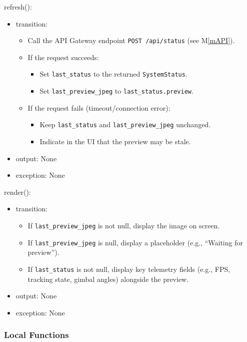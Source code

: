 \documentclass[12pt, titlepage]{article}
\newcommand{\mref}[1]{M\ref{#1}}
\begin{document}
\noindent refresh():
\begin{itemize}
  \item transition:
        \begin{itemize}
          \item Call the API Gateway endpoint \texttt{POST /api/status} (see \mref{mAPI}).
          \item If the request succeeds:
                \begin{itemize}
                  \item Set \texttt{last\_status} to the returned \texttt{SystemStatus}.
                  \item Set \texttt{last\_preview\_jpeg} to \texttt{last\_status.preview}.
                \end{itemize}
          \item If the request fails (timeout/connection error):
                \begin{itemize}
                  \item Keep \texttt{last\_status} and \texttt{last\_preview\_jpeg} unchanged.
                  \item Indicate in the UI that the preview may be stale.
                \end{itemize}
        \end{itemize}
  \item output: None
  \item exception: None
\end{itemize}

\noindent render():
\begin{itemize}
  \item transition:
        \begin{itemize}
          \item If \texttt{last\_preview\_jpeg} is not null, display the image on screen.
          \item If \texttt{last\_preview\_jpeg} is null, display a placeholder (e.g., ``Waiting
                for preview'').
          \item If \texttt{last\_status} is not null, display key telemetry fields (e.g., FPS,
                tracking state, gimbal angles) alongside the preview.
        \end{itemize}
  \item output: None
  \item exception: None
\end{itemize}

\subsubsection{Local Functions}
\end{document}
